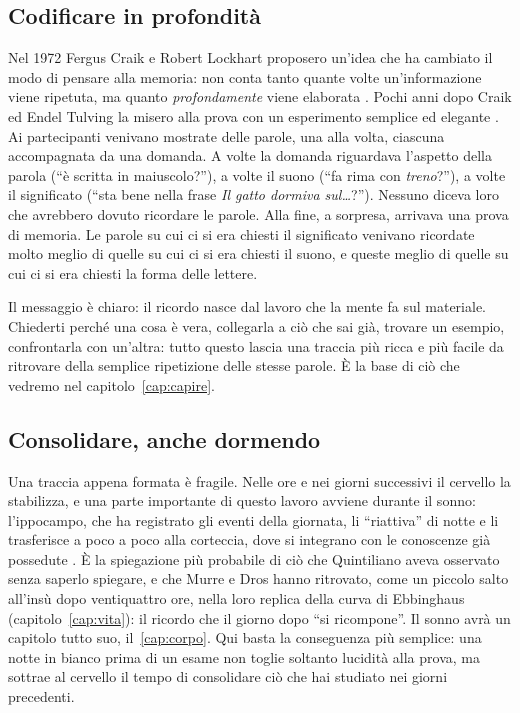 \subsection*{Codificare in profondità}

Nel 1972 Fergus Craik e Robert Lockhart proposero un'idea che ha
cambiato il modo di pensare alla memoria: non conta tanto quante volte
un'informazione viene ripetuta, ma quanto \emph{profondamente} viene
elaborata \parencite{craik1972}. Pochi anni dopo Craik ed Endel Tulving
la misero alla prova con un esperimento semplice ed elegante
\parencite{craik1975}. Ai partecipanti venivano mostrate delle parole,
una alla volta, ciascuna accompagnata da una domanda. A volte la
domanda riguardava l'aspetto della parola (\enquote{è scritta in
maiuscolo?}), a volte il suono (\enquote{fa rima con \emph{treno}?}), a
volte il significato (\enquote{sta bene nella frase \emph{Il gatto
dormiva sul\dots}?}). Nessuno diceva loro che avrebbero dovuto
ricordare le parole. Alla fine, a sorpresa, arrivava una prova di
memoria. Le parole su cui ci si era chiesti il significato venivano
ricordate molto meglio di quelle su cui ci si era chiesti il suono, e
queste meglio di quelle su cui ci si era chiesti la forma delle
lettere.

Il messaggio è chiaro: il ricordo nasce dal lavoro che la mente fa sul
materiale. Chiederti perché una cosa è vera, collegarla a ciò che sai
già, trovare un esempio, confrontarla con un'altra: tutto questo
lascia una traccia più ricca e più facile da ritrovare della semplice
ripetizione delle stesse parole. È la base di ciò che vedremo nel
capitolo~\ref{cap:capire}.

\subsection*{Consolidare, anche dormendo}

Una traccia appena formata è fragile. Nelle ore e nei giorni successivi
il cervello la stabilizza, e una parte importante di questo lavoro
avviene durante il sonno: l'ippocampo, che ha registrato gli eventi
della giornata, li \enquote{riattiva} di notte e li trasferisce a poco
a poco alla corteccia, dove si integrano con le conoscenze già
possedute \parencite{rasch2013}. È la spiegazione più probabile di ciò
che Quintiliano aveva osservato senza saperlo spiegare, e che
Murre e Dros hanno ritrovato, come un piccolo salto all'insù dopo
ventiquattro ore, nella loro replica della curva di Ebbinghaus
(capitolo~\ref{cap:vita}): il ricordo che il giorno dopo
\enquote{si ricompone}. Il sonno avrà un
capitolo tutto suo, il~\ref{cap:corpo}. Qui basta la conseguenza più
semplice: una notte in bianco prima di un esame non toglie soltanto
lucidità alla prova, ma sottrae al cervello il tempo di consolidare ciò
che hai studiato nei giorni precedenti.

